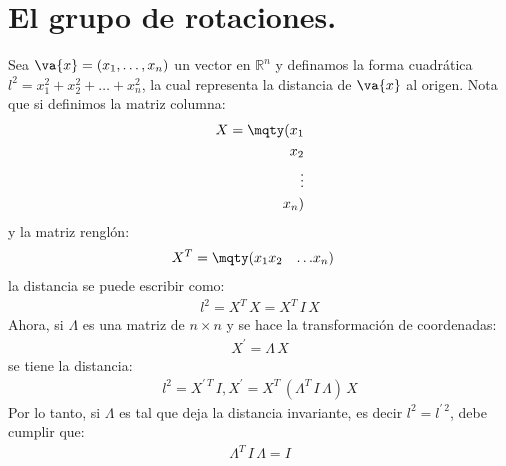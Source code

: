 \section{El grupo de rotaciones.}

Sea $\va{x} = (x_{1}, \ldots, x_{n})$ un vector en $\mathbb{R}^{n}$ y definamos la forma cuadrática $l^{2} = x_{1}^{2} + x_{2}^{2} + \ldots + x_{n}^{2}$, la cual representa la distancia de $\va{x}$ al origen. Nota que si definimos la matriz columna:
\begin{align}
X = \mqty(x_{1} \\ x_{2} \\ \vdots \\ x_{n})
\label{eq:ecuacion_10_038}
\end{align}
y la matriz renglón:
\begin{align}
X^{T} = \mqty(x_{1} & x_{2} & \ldots & x_{n})
\label{eq:ecuacion_10_039}
\end{align}
la distancia se puede escribir como:
\begin{align}
l^{2} = X^{T} \, X = X^{T} \, I \, X 
\label{eq:ecuacion_10_040}
\end{align}
Ahora, si $\Lambda$ es una matriz de $n \times n$ y se hace la transformación de coordenadas:
\begin{align}
X^{\prime} = \Lambda \, X
\label{eq:ecuacion_10_041}
\end{align}
se tiene la distancia:
\begin{align}
l^{2} = X^{\prime \, T} \, I , X^{\prime} = X^{T} \, \left( \Lambda^{T} \, I \, \Lambda \right) \, X 
\label{eq:ecuacion_10_042}
\end{align}
Por lo tanto, si $\Lambda$ es tal que deja la distancia invariante, es decir $l^{2} = l^{\prime \, 2}$, debe cumplir que:
\begin{align}
\Lambda^{T} \, I \, \Lambda = I
\label{eq:ecuacion_10_043}
\end{align}

